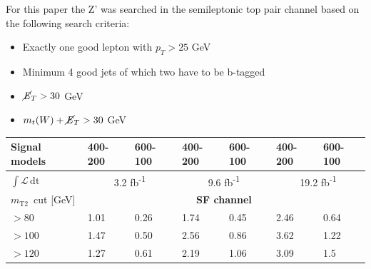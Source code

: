 \documentclass[runningheads,a4paper]{llncs}
\newcommand{\mttwo}{$m_{\text{T2}}$}
\newcommand{\invfb}{fb\textsuperscript{-1}}
\newcommand{\lumi}{$\int \mathcal{L} \, \mathrm{dt}$}
\begin{document}
For this paper the Z' was searched in the semileptonic top pair channel based on the following search criteria:
\begin{itemize}
\item Exactly one good lepton with ${p}_{T} > 25$ GeV
\item Minimum 4 good jets of which two have to be b-tagged
\item $\cancel{\it{E}}_{T} > 30$ GeV 
\item ${m}_{t}(W) + \cancel{\it{E}}_{T} > 30$ GeV
\end{itemize}

\begin{table}[h]
\centering
\captionsetup{width=0.8\textwidth}
\begin{tabular}{|l|llllll}
\hline
Signal models     & \multicolumn{1}{l|}{400-200} & \multicolumn{1}{l|}{600-100} & \multicolumn{1}{l|}{400-200} & \multicolumn{1}{l|}{600-100} & \multicolumn{1}{l|}{400-200} & \multicolumn{1}{l|}{600-100} \\ \hline
\hspace{5mm} \lumi     & \multicolumn{2}{c|}{3.2 \invfb}                                                     & \multicolumn{2}{c|}{9.6 \invfb}                                                     & \multicolumn{2}{c|}{19.2 \invfb}                                                    \\ \hline 
 \mttwo \, cut [GeV]            & \multicolumn{6}{c|}{\textbf{SF channel}}                                                                                                                                                                                                                   \\ \hline
$>80$  & \multicolumn{1}{l|}{1.01}               & \multicolumn{1}{l|}{0.26}               & \multicolumn{1}{l|}{1.74}               & \multicolumn{1}{l|}{0.45}               & \multicolumn{1}{l|}{2.46}               & \multicolumn{1}{l|}{0.64}               \\ \hline
$>100$ & \multicolumn{1}{l|}{1.47}               & \multicolumn{1}{l|}{0.50}               & \multicolumn{1}{l|}{2.56}               & \multicolumn{1}{l|}{0.86}               & \multicolumn{1}{l|}{3.62}               & \multicolumn{1}{l|}{1.22}               \\ \hline
$>120$  & \multicolumn{1}{l|}{1.27}               & \multicolumn{1}{l|}{0.61}               & \multicolumn{1}{l|}{2.19}               & \multicolumn{1}{l|}{1.06}               & \multicolumn{1}{l|}{3.09}               & \multicolumn{1}{l|}{1.5}                \\ \hline

\end{tabular}
\end{table}
\end{document}
